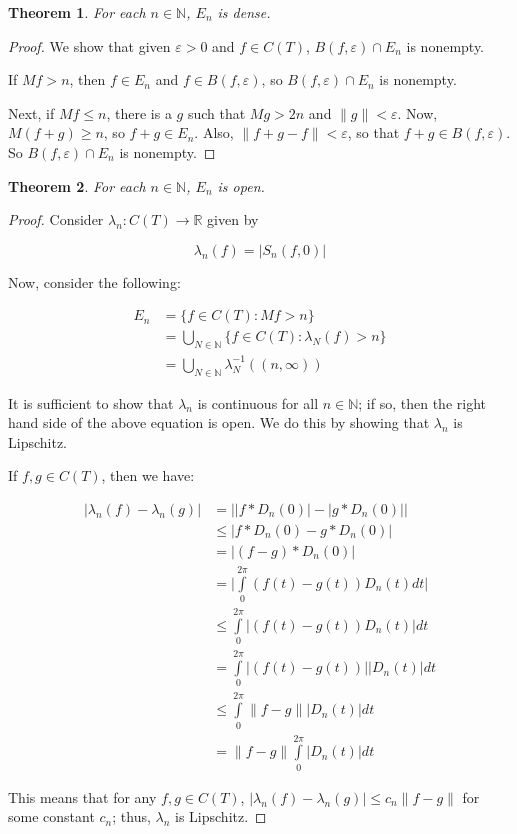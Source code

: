 \documentclass{amsart}
\newcommand{\vep}{\varepsilon}
\newcommand{\la}{\lambda}
\newcommand{\N}{\mathbb{N}}
\newcommand{\R}{\mathbb{R}}
\newcommand{\absval}[1]{\lvert #1 \rvert}
\newcommand{\norm}[1]{\|#1\|}
\newtheorem{thm}{Theorem}[section]
\theoremstyle{definition}
\begin{document}
\begin{thm}
For each $n \in \N$, $E_n$ is dense.
\end{thm}

\begin{proof}

We show that given $\vep>0$ and $f \in C(T)$, $B(f,\vep) \cap E_n$ is nonempty. 

If $Mf > n$, then $f \in E_n$ and $f \in B(f, \vep)$, so $B(f, \vep) \cap E_n$ is nonempty.

Next, if $Mf \leq n$, there is a $g$ such that $Mg > 2n$ and $\norm{g} < \vep$. 
Now, $M(f+g) \geq n$, so $f+g \in E_n$. 
Also, $\norm{f+g -f} < \vep$, so that $f+g \in B(f, \vep)$. 
So $B(f, \vep) \cap E_n$ is nonempty.

\end{proof}

\begin{thm}
For each $n \in \N$, $E_n$ is open.
\end{thm}

\begin{proof}
Consider $\la_n: C(T) \to \R$ given by

\begin{displaymath}
\la_n(f) = \absval{S_n(f,0)}
\end{displaymath}

Now, consider the following:

\begin{align*}
E_n &= \{f \in C(T): Mf> n\} \\
&= \bigcup\limits_{N \in \N} \{f \in C(T) : \la_N (f)> n\}\\
&= \bigcup\limits_{N \in \N} \la_N^{-1}((n, \infty))
\end{align*}

It is sufficient to show that $\la_n$ is continuous for all $n \in \N$; if so, then the right hand side of the above equation is open.
We do this by showing that $\la_n$ is Lipschitz.

If $f, g \in C(T)$, then we have:

\begin{align*}
\absval{\la_n(f) - \la_n(g)} &= \absval{\absval{f \ast D_n(0)} - \absval{g \ast D_n(0)}} \\
&\leq \absval{f \ast D_n(0) - g \ast D_n(0)} \\
&= \absval{(f-g) \ast D_n(0)} \\
&= \absval{\int\limits_0^{2\pi} (f(t)-g(t))D_n(t)dt} \\
&\leq \int\limits_0^{2\pi} \absval{(f(t)-g(t))D_n(t)}dt \\
&= \int\limits_0^{2\pi} \absval{(f(t)-g(t))}\absval{D_n(t)}dt \\
&\leq \int\limits_0^{2\pi} \norm{f-g}\absval{D_n(t)}dt \\
&= \norm{f-g} \int\limits_0^{2\pi} \absval{D_n(t)}dt
\end{align*}

This means that for any $f,g \in C(T)$, $\absval{\la_n(f) - \la_n(g)} \leq c_n \norm{f-g}$ for some constant $c_n$; thus, $\la_n$ is Lipschitz.

\end{proof}
\end{document}
